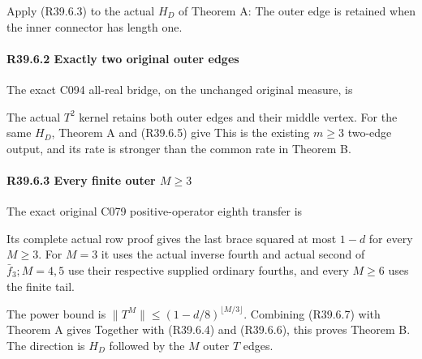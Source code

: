 Apply (R39.6.3) to the actual \(H_D\) of Theorem A:
The outer edge is retained when the inner connector has length one.

\paragraph{R39.6.2 Exactly two original outer edges}

The exact C094 all-real bridge, on the unchanged original measure, is


The actual \(T^2\) kernel retains both outer edges and their
middle vertex. For the same \(H_D\), Theorem A and (R39.6.5) give
This is the existing \(m\ge3\) two-edge output, and its rate is
stronger than the common rate in Theorem B.

\paragraph{R39.6.3 Every finite outer \(M\ge 3\)}

The exact original C079 positive-operator eighth transfer is


Its complete actual row proof gives the last brace squared at most \(1-d\) for every \(M\ge 3\). For \(M=3\) it uses the actual inverse fourth and actual second of \(\bar f_{3}; M=4,\allowbreak \allowbreak 5\) use their respective supplied ordinary fourths, and every \(M\ge 6\) uses the finite tail. 

The power bound is
\(\|T^M\|\le(1-d/8)^{\lfloor M/3\rfloor}\). Combining
(R39.6.7) with Theorem A gives
Together with (R39.6.4) and (R39.6.6), this proves Theorem B.
The direction is \(H_D\) followed by the \(M\) outer \(T\) edges.

